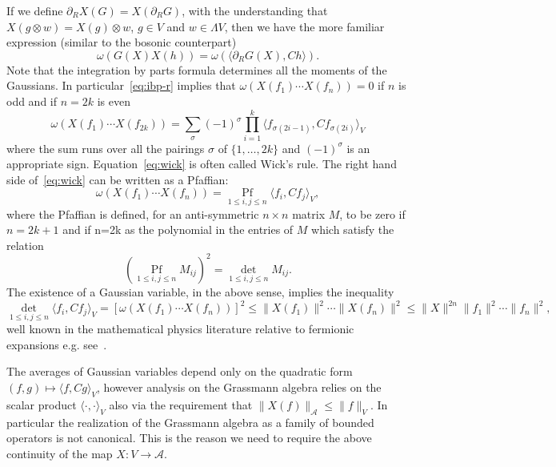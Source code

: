\documentclass{article}
\newcommand{\tmop}[1]{\ensuremath{\operatorname{#1}}}
\begin{document}
If we define $\partial_R X (G) = X (\partial_R G)$, with the understanding
that $X (g \otimes w) = X (g) \otimes w$, $g \in V$ and $w \in \Lambda V$,
then we have the more familiar expression (similar to the bosonic counterpart)
\[ \omega (G (X) X (h)) = \omega (\langle \partial_R G (X), C h \rangle) . \]
Note that the integration by parts formula determines all the moments of the
Gaussians. In particular~{\eqref{eq:ibp-r}} implies that $\omega (X (f_1)
\cdots X (f_n)) = 0$ if $n$ is odd and if $n = 2 k$ is even
\begin{equation}
  \omega (X (f_1) \cdots X (f_{2 k})) = \sum_{\sigma} (- 1)^{\sigma} \prod_{i
  = 1}^k \langle f_{\sigma (2 i - 1)}, C f_{\sigma (2 i)} \rangle_V
  \label{eq:wick}
\end{equation}
where the sum runs over all the pairings $\sigma$ of $\{ 1, \ldots, 2 k \}$
and $(- 1)^{\sigma}$ is an appropriate sign. Equation~{\eqref{eq:wick}} is
often called Wick's rule. The right hand side of~{\eqref{eq:wick}} can be
written as a Pfaffian:
\begin{equation}
  \omega (X (f_1) \cdots X (f_n)) = \underset{1 \leqslant i, j \leqslant
  n}{\tmop{Pf}} \langle f_i, C f_j \rangle_V, \label{eq:pfaff}
\end{equation}
where the Pfaffian is defined, for an anti-symmetric $n \times n$ matrix $M$,
to be zero if $n = 2 k + 1$ and if n=2k as the polynomial in the entries of
$M$ which satisfy the relation
\[ (\underset{1 \leqslant i, j \leqslant n}{\tmop{Pf}} M_{i j})^2 =
   \underset{1 \leqslant i, j \leqslant n}{\det} M_{i j} . \]
The existence of a Gaussian variable, in the above sense, implies the
inequality
\[ \underset{1 \leqslant i, j \leqslant n}{\det} \langle f_i, C f_j \rangle_V
   = [\omega (X (f_1) \cdots X (f_n))]^2 \leqslant \| X (f_1) \|^2 \cdots \| X
   (f_n) \|^2 \leqslant \| X \|^{2 n} \| f_1 \|^2 \cdots \| f_n \|^2, \]
well known in the mathematical physics literature relative to fermionic
expansions e.g. see~{\cite{mastropietro_non-perturbative_2008}}.

\begin{remark}
  The averages of Gaussian variables depend only on the quadratic form $(f, g)
  \mapsto \langle f, C g \rangle_V$, however analysis on the Grassmann algebra
  relies on the scalar product $\langle \cdot, \cdot \rangle_V$ also via the
  requirement that $\| X (f) \|_{\mathcal{A}} \leqslant \| f \|_V$. In
  particular the realization of the Grassmann algebra as a family of bounded
  operators is not canonical. This is the reason we need to require the above
  continuity of the map $X : V \rightarrow \mathcal{A}$.
\end{remark}
\end{document}
